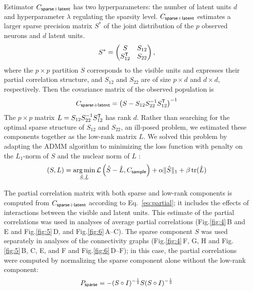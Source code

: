 \documentclass[10pt]{article}
\DeclareMathOperator{\Tr}{tr}
\newcommand{\figref}[2]{Fig.\;\ref{fig:#1}\,#2}
\newcommand{\loss}[1]{\mathcal L\left(#1\right)}
\newcommand{\T}{{\sf T}}
\DeclareMathOperator*{\argmin}{arg\,min}
\begin{document}
Estimator $C_{\sf sparse+latent}$ has two hyperparameters: the number of latent units $d$ and hyperparameter $\lambda$ regulating the sparsity level. $C_{\sf sparse+latent}$ estimates a larger sparse precision matrix $S^\ast$ of the joint distribution of the $p$ observed neurons and $d$ latent units.  
\begin{equation}
S^\ast=
\begin{pmatrix}
S & S_{12} \\
S_{12}^\T & S_{22}
\end{pmatrix},
\end{equation}
where the $p\times p$ partition $S$ corresponds to the visible units and expresses their partial correlation structure, and $S_{12}$ and $S_{22}$ are of size $p\times d$ and $d\times d$, respectively. 
Then the covariance matrix of the observed population is 
\begin{equation}
C_{\sf sparse+latent} = \left(S-S_{12}S_{22}^{-1}S_{12}^\T\right)^{-1}
\end{equation}
The $p\times p$  matrix $L=S_{12}S_{22}^{-1}S_{12}^\T$ has rank $d$. Rather than searching for the optimal sparse structure of $S_{12}$ and $S_{22}$, an ill-posed problem, we estimated these components together as the low-rank matrix $L$. We solved this problem by adapting the ADMM algorithm to minimizing the loss function with penalty on the $L_1$-norm  of $S$ and the nuclear norm of $L$ \cite{Chandrasekaran:2010,Ma:2013}:
\begin{equation}\label{eq:ma}
(S,L) = \argmin\limits_{\hat S,\hat L} \loss{\hat S-\hat L, C_{\sf sample}} + \alpha\|\hat S\|_1 + \beta\Tr(\hat L)
\end{equation}

The partial correlation matrix with both sparse and low-rank components is computed from $C_{\sf sparse+latent}$ according to Eq.~\ref{eq:partial}; it includes the effects of interactions between the visible and latent units.  This estimate of the partial correlations was used in analyses of average partial correlations (\figref{4}{B and E} and \figref{5}{D}, and \figref{6}{A--C}).  The sparse component $S$ was used separately in analyses of the connectivity graphs (\figref{4}{F, G, H} and \figref{5}{B, C, E, and F} and \figref{6}{D--F}); in this case, the partial correlations were computed by normalizing the sparse component alone without the low-rank component: 
\begin{equation}
P_{\sf sparse} = -(S\circ I)^{-\frac 1 2} S  (S\circ I)^{-\frac 1 2}
\end{equation}
\end{document}
